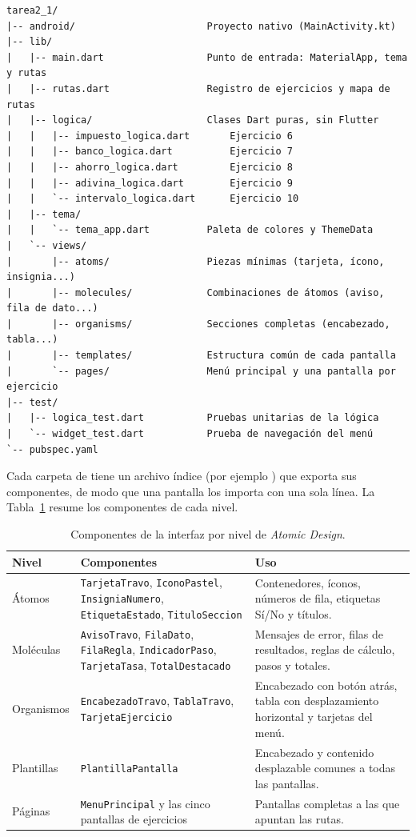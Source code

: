 \documentclass[12pt,a4paper]{article}
\begin{document}
\begin{lstlisting}[caption={Estructura de carpetas del proyecto.}, label={lst:estructura}]
tarea2_1/
|-- android/                       Proyecto nativo (MainActivity.kt)
|-- lib/
|   |-- main.dart                  Punto de entrada: MaterialApp, tema y rutas
|   |-- rutas.dart                 Registro de ejercicios y mapa de rutas
|   |-- logica/                    Clases Dart puras, sin Flutter
|   |   |-- impuesto_logica.dart       Ejercicio 6
|   |   |-- banco_logica.dart          Ejercicio 7
|   |   |-- ahorro_logica.dart         Ejercicio 8
|   |   |-- adivina_logica.dart        Ejercicio 9
|   |   `-- intervalo_logica.dart      Ejercicio 10
|   |-- tema/
|   |   `-- tema_app.dart          Paleta de colores y ThemeData
|   `-- views/
|       |-- atoms/                 Piezas mínimas (tarjeta, ícono, insignia...)
|       |-- molecules/             Combinaciones de átomos (aviso, fila de dato...)
|       |-- organisms/             Secciones completas (encabezado, tabla...)
|       |-- templates/             Estructura común de cada pantalla
|       `-- pages/                 Menú principal y una pantalla por ejercicio
|-- test/
|   |-- logica_test.dart           Pruebas unitarias de la lógica
|   `-- widget_test.dart           Prueba de navegación del menú
`-- pubspec.yaml
\end{lstlisting}

Cada carpeta de  tiene un archivo índice (por ejemplo ) que exporta sus componentes, de modo que una pantalla los importa con una sola línea. La Tabla~\ref{tab:atomic} resume los componentes de cada nivel.

\begin{table}[H]
\centering
\small
\caption{Componentes de la interfaz por nivel de \textit{Atomic Design}.}
\label{tab:atomic}
\begin{tabular}{|p{2.4cm}|p{6.2cm}|p{5.8cm}|}
\hline
\textbf{Nivel} & \textbf{Componentes} & \textbf{Uso} \\ \hline
Átomos & \texttt{TarjetaTravo}, \texttt{IconoPastel}, \texttt{InsigniaNumero}, \texttt{EtiquetaEstado}, \texttt{TituloSeccion} & Contenedores, íconos, números de fila, etiquetas Sí/No y títulos. \\ \hline
Moléculas & \texttt{AvisoTravo}, \texttt{FilaDato}, \texttt{FilaRegla}, \texttt{IndicadorPaso}, \texttt{TarjetaTasa}, \texttt{TotalDestacado} & Mensajes de error, filas de resultados, reglas de cálculo, pasos y totales. \\ \hline
Organismos & \texttt{EncabezadoTravo}, \texttt{TablaTravo}, \texttt{TarjetaEjercicio} & Encabezado con botón atrás, tabla con desplazamiento horizontal y tarjetas del menú. \\ \hline
Plantillas & \texttt{PlantillaPantalla} & Encabezado y contenido desplazable comunes a todas las pantallas. \\ \hline
Páginas & \texttt{MenuPrincipal} y las cinco pantallas de ejercicios & Pantallas completas a las que apuntan las rutas. \\ \hline
\end{tabular}
\end{table}
\end{document}
